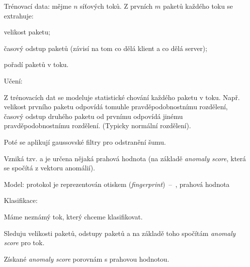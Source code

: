 \begin{compactitem}
    \item Trénovací data: mějme $n$ síťových toků. Z prvních $m$ paketů každého toku se extrahuje: \begin{compactitem}
        \item velikost paketu;
        \item časový odstup paketů (závisí na tom co dělá klient a co dělá server);
        \item pořadí paketů v toku.
    \end{compactitem}
    \item Učení: \begin{compactitem}
        \item Z trénovacích dat se modeluje statistické chování každého paketu v toku. Např. velikost prvního paketu odpovídá tomuhle pravděpodobnostnímu rozdělení, časový odstup druhého paketu od prvnímu odpovídá jinému pravděpodobnostnímu rozdělení. (Typicky normální rozdělení).
        \item Poté se aplikují gaussovské filtry pro odstranění šumu.
        \item Vzniká tzv.  a je určena nějaká prahová hodnota (na základě \textit{anomaly score}, která se spočítá z vektoru anomálií).
    \end{compactitem}
    \item Model: protokol je reprezentován otiskem (\textit{fingerprint})~--~, prahová hodnota
    \item Klasifikace: \begin{compactitem}
        \item Máme neznámý tok, který chceme klasifikovat.
        \item Sleduju velikosti paketů, odstupy paketů a na základě toho spočítám \textit{anomaly score} pro tok.
        \item Získané \textit{anomaly score} porovnám s prahovou hodnotou.
    \end{compactitem}
\end{compactitem}

